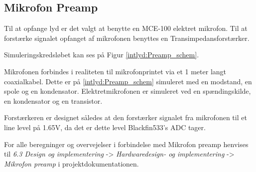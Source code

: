 \subsection{Mikrofon Preamp}
Til at opfange lyd er det valgt at benytte en MCE-100 elektret mikrofon. Til at forstærke signalet opfanget af mikrofonen benyttes en Transimpedansforstærker. 

Simuleringskredsløbet kan ses på Figur \ref{intlyd:Preamp_schem}.	


Mikrofonen forbindes i realiteten til mikrofonprintet via et 1 meter langt coaxialkabel. Dette er på \ref{intlyd:Preamp_schem} simuleret med en modstand, en spole og en kondensator. Elektretmikrofonen er simuleret ved en spændingskilde, en kondensator og en transistor. 

Forstærkeren er designet således at den forstærker signalet fra mikrofonen til et line level på 1.65V, da det er dette level Blackfin533's ADC tager. 

For alle beregninger og overvejelser i forbindelse med Mikrofon preamp henvises til \textit{6.3 Design og implementering} -> \textit{Hardwaredesign- og implementering} -> \textit{Mikrofon preamp} i projektdokumentationen. 